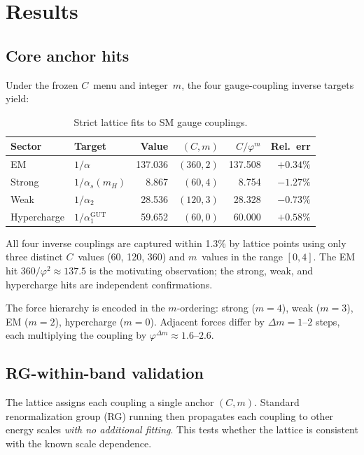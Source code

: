 \documentclass[12pt,a4paper]{article}
\newcommand{\vp}{\varphi}
\begin{document}
\section{Results}
\label{sec:results}

\subsection{Core anchor hits}
\label{sec:anchors}

Under the frozen $C$~menu and integer~$m$, the four gauge-coupling inverse
targets yield:

\begin{table}[H]
\centering
\caption{Strict lattice fits to SM gauge couplings.}
\label{tab:anchors}
\begin{tabular}{@{}llrrrr@{}}
\toprule
Sector & Target & Value & $(C, m)$ & $C/\vp^m$ & Rel.~err \\
\midrule
EM & $1/\alpha$ & 137.036 & $(360, 2)$ & 137.508 & $+0.34\%$ \\
Strong & $1/\alpha_s(m_H)$ & 8.867 & $(60, 4)$ & 8.754 & $-1.27\%$ \\
Weak & $1/\alpha_2$ & 28.536 & $(120, 3)$ & 28.328 & $-0.73\%$ \\
Hypercharge & $1/\alpha_1^{\mathrm{GUT}}$ & 59.652 & $(60, 0)$ & 60.000 & $+0.58\%$ \\
\bottomrule
\end{tabular}
\end{table}

All four inverse couplings are captured within 1.3\% by lattice points using
only three distinct $C$~values (60, 120, 360) and $m$~values in the range
$[0, 4]$.  The EM hit $360/\vp^2 \approx 137.5$ is the motivating observation;
the strong, weak, and hypercharge hits are independent confirmations.

The force hierarchy is encoded in the $m$-ordering: strong ($m=4$), weak
($m=3$), EM ($m=2$), hypercharge ($m=0$).  Adjacent forces differ by
$\Delta m = 1$--$2$ steps, each multiplying the coupling by
$\vp^{\Delta m} \approx 1.6$--$2.6$.

\subsection{RG-within-band validation}
\label{sec:rg}

The lattice assigns each coupling a single anchor $(C,m)$.  Standard
renormalization group (RG) running then propagates each coupling to other
energy scales \emph{with no additional fitting}.  This tests whether the
lattice is consistent with the known scale dependence.
\end{document}
